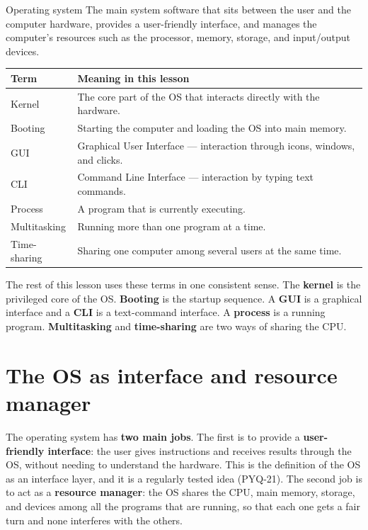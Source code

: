 \begin{definitionbox}{Operating system}
The main system software that sits between the user and the computer hardware,
provides a user-friendly interface, and manages the computer's resources such
as the processor, memory, storage, and input/output devices.
\end{definitionbox}

\begin{center}
\begin{tabular}{p{}p{}}
\toprule
\textbf{Term} & \textbf{Meaning in this lesson} \\
\midrule
Kernel & The core part of the OS that interacts directly with the hardware. \\
Booting & Starting the computer and loading the OS into main memory. \\
GUI & Graphical User Interface --- interaction through icons, windows, and clicks. \\
CLI & Command Line Interface --- interaction by typing text commands. \\
Process & A program that is currently executing. \\
Multitasking & Running more than one program at a time. \\
Time-sharing & Sharing one computer among several users at the same time. \\
\bottomrule
\end{tabular}
\end{center}

The rest of this lesson uses these terms in one consistent sense. The
\textbf{kernel} is the privileged core of the OS. \textbf{Booting} is the
startup sequence. A \textbf{GUI} is a graphical interface and a \textbf{CLI}
is a text-command interface. A \textbf{process} is a running program.
\textbf{Multitasking} and \textbf{time-sharing} are two ways of sharing the
CPU.

\section{The OS as interface and resource manager}
The operating system has \textbf{two main jobs}. The first is to provide a
\textbf{user-friendly interface}: the user gives instructions and receives
results through the OS, without needing to understand the hardware. This is
the definition of the OS as an interface layer, and it is a regularly tested
idea (PYQ-21). The second job is to act as a \textbf{resource manager}: the OS
shares the CPU, main memory, storage, and devices among all the programs that
are running, so that each one gets a fair turn and none interferes with the
others.

